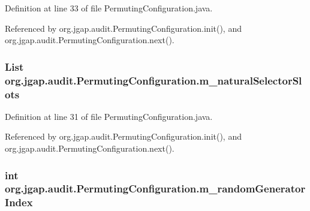 Definition at line 33 of file Permuting\-Configuration.\-java.



Referenced by org.\-jgap.\-audit.\-Permuting\-Configuration.\-init(), and org.\-jgap.\-audit.\-Permuting\-Configuration.\-next().

\hypertarget{classorg_1_1jgap_1_1audit_1_1_permuting_configuration_a4f35e5a811a4dcccf937933ed92aaa4d}{
\subsubsection[{m\-\_\-natural\-Selector\-Slots}]{\setlength{\rightskip}{0pt plus 5cm}List org.\-jgap.\-audit.\-Permuting\-Configuration.\-m\-\_\-natural\-Selector\-Slots\hspace{0.3cm}{\ttfamily [private]}}}\label{classorg_1_1jgap_1_1audit_1_1_permuting_configuration_a4f35e5a811a4dcccf937933ed92aaa4d}


Definition at line 31 of file Permuting\-Configuration.\-java.



Referenced by org.\-jgap.\-audit.\-Permuting\-Configuration.\-init(), and org.\-jgap.\-audit.\-Permuting\-Configuration.\-next().

\hypertarget{classorg_1_1jgap_1_1audit_1_1_permuting_configuration_aec769b8be74c5a9b0345772af2681bb2}{
\subsubsection[{m\-\_\-random\-Generator\-Index}]{\setlength{\rightskip}{0pt plus 5cm}int org.\-jgap.\-audit.\-Permuting\-Configuration.\-m\-\_\-random\-Generator\-Index\hspace{0.3cm}{\ttfamily [private]}}}\label{classorg_1_1jgap_1_1audit_1_1_permuting_configuration_aec769b8be74c5a9b0345772af2681bb2}


